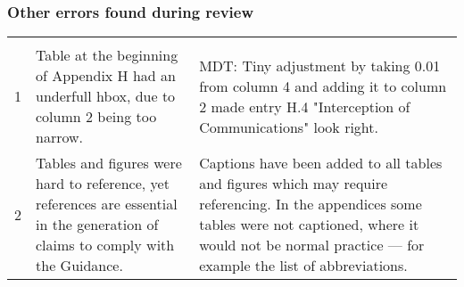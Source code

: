 \subsubsection{Other errors found during review}
%
\begin{longtable}[H]
{|L{}|L{}|L{}|}
\hline
{} &  & \\
\hline
  \endfirsthead
  \hline{} &  & \\\hline
  \endhead
  \endfoot
  \endlastfoot

  1&Table at the beginning of Appendix H had an underfull hbox, due to column 2 being too narrow.&MDT: Tiny adjustment by taking 0.01 from column 4 and adding it to column 2 made entry H.4 "Interception of Communications" look right.\\\hline
2&Tables and figures were hard to reference, yet references are essential in the generation of claims to comply with the Guidance.&Captions have been added to all tables and figures which may require referencing. In the appendices some tables were not captioned, where it would not be normal practice --- for example the list of abbreviations.\\\hline
\end{longtable}

\clearpage
